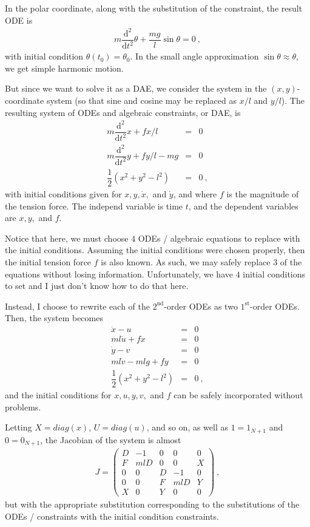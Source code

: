 \documentclass[11pt]{amsdtx}
\newcommand{\ud}{\mathrm{d}}
\newcommand{\st}{\mathrm{st}}
\newcommand{\nd}{\mathrm{nd}}
\begin{document}
In the polar coordinate, along with the substitution of the constraint, the result ODE is
\begin{eqnarray} \label{eq:func_ode}
	m \dfrac{\ud^2}{\ud t^2} \theta + \dfrac{m g}{l} \sin \theta = 0~,
\end{eqnarray}
with initial condition $\theta(t_0) = \theta_0$.  In the small angle approximation $\sin \theta \approx \theta$, we get simple harmonic motion.

But since we want to solve it as a DAE, we consider the system in the $(x, y)$-coordinate system (so that sine and cosine may be replaced as $x/l$ and $y/l$).  The resulting system of ODEs and algebraic constraints, or DAE, is
\begin{eqnarray}
	m \dfrac{\ud^2}{\ud t^2} x + fx/l &=& 0\\
	m \dfrac{\ud^2}{\ud t^2} y + fy/l - mg &=&  0\\
	\dfrac{1}{2} \left( x^2 + y^2 - l^2 \right) &=& 0~,
\end{eqnarray}
with initial conditions given for $x, y, \dot{x},$ and $\dot{y}$, and where $f$ is the magnitude of the tension force.  The independ variable is time $t$, and the dependent variables are $x, y,$ and $f$.

Notice that here, we must choose $4$ ODEs / algebraic equations to replace with the initial conditions.  Assuming the initial conditions were chosen properly, then the initial tension force $f$ is also known.  As such, we may safely replace $3$ of the equations without losing information.  Unfortunately, we have $4$ initial conditions to set and I just don't know how to do that here.

Instead, I choose to rewrite each of the $2^{\nd}$-order ODEs as two $1^{\st}$-order ODEs.  Then, the system becomes
\begin{eqnarray} \label{eq:func_dae}
	\dot{x} - u &=& 0 \\
	ml\dot{u} + fx &=& 0 \\
	\dot{y} - v &=& 0 \\
	ml \dot{v} - mlg + fy &=& 0 \\
	\dfrac{1}{2} \left( x^2 + y^2 - l^2 \right) &=& 0~,
\end{eqnarray}
and the initial conditions for $x, u, y, v,$ and $f$ can be safely incorporated without problems.

Letting $X = diag(x)$, $U = diag(u)$, and so on, as well as $1 = 1_{N+1}$ and $0 = 0_{N+1}$, the Jacobian of the system is almost
\begin{eqnarray} \label{eq:jacobian_dae}
	J = \begin{pmatrix}
		D & -1 & 0 & 0 & 0 \\
		F & mlD & 0 & 0 & X \\
		0 & 0 & D & -1 & 0 \\
		0 & 0 & F & mlD & Y \\
		X & 0 & Y & 0 & 0
	\end{pmatrix}~,
\end{eqnarray}
but with the appropriate substitution corresponding to the substitutions of the ODEs / constraints with the initial condition constraints.
\end{document}
